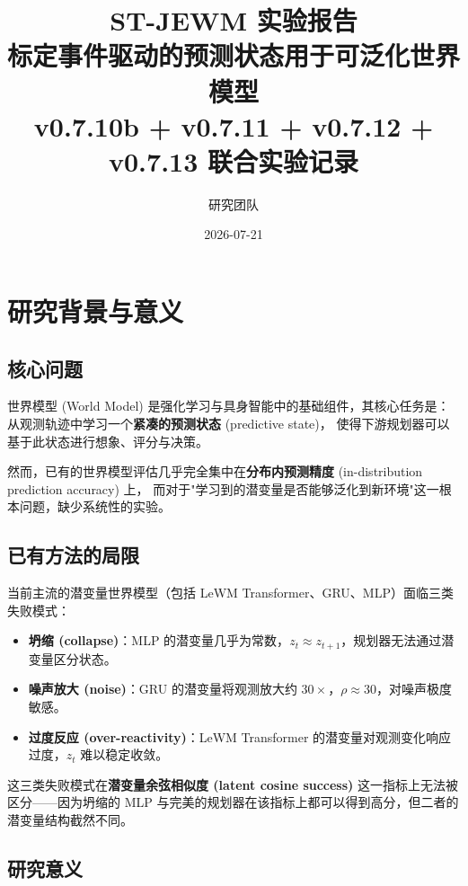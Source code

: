 \documentclass[11pt,a4paper]{article}
\title{\textbf{ST-JEWM 实验报告} \\[0.3em]
\large 标定事件驱动的预测状态用于可泛化世界模型 \\[0.3em]
\normalsize v0.7.10b + v0.7.11 + v0.7.12 + v0.7.13 联合实验记录}
\author{研究团队}
\date{2026-07-21}
\begin{document}
\maketitle
\maketitle

\section{研究背景与意义}

\subsection{核心问题}

世界模型 (World Model) 是强化学习与具身智能中的基础组件，其核心任务是：
从观测轨迹中学习一个\textbf{紧凑的预测状态} (predictive state)，
使得下游规划器可以基于此状态进行想象、评分与决策。

然而，已有的世界模型评估几乎完全集中在\textbf{分布内预测精度} (in-distribution prediction accuracy) 上，
而对于"学习到的潜变量是否能够泛化到新环境"这一根本问题，缺少系统性的实验。

\subsection{已有方法的局限}

当前主流的潜变量世界模型（包括 LeWM Transformer、GRU、MLP）面临三类失败模式：
\begin{itemize}
    \item \textbf{坍缩 (collapse)}：MLP 的潜变量几乎为常数，$z_t \approx z_{t+1}$，规划器无法通过潜变量区分状态。
    \item \textbf{噪声放大 (noise)}：GRU 的潜变量将观测放大约 $30\times$，$\rho \approx 30$，对噪声极度敏感。
    \item \textbf{过度反应 (over-reactivity)}：LeWM Transformer 的潜变量对观测变化响应过度，$z_t$ 难以稳定收敛。
\end{itemize}
这三类失败模式在\textbf{潜变量余弦相似度 (latent cosine success)} 这一指标上无法被区分——因为坍缩的 MLP 与完美的规划器在该指标上都可以得到高分，但二者的潜变量结构截然不同。

\subsection{研究意义}
\end{document}
